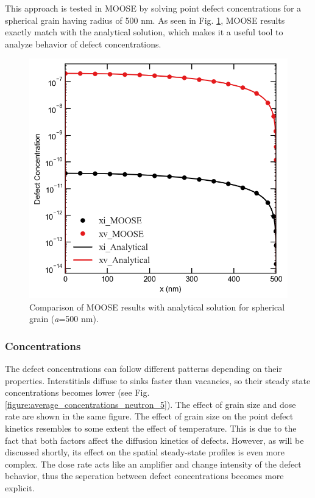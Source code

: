 \documentclass[a4paper]{article}
\begin{document}
  This approach is tested in MOOSE by solving point defect concentrations for a spherical grain having radius of 500 nm. As seen in Fig. \ref{figure:concentrations_MOOSE_analytical}, MOOSE results exactly match with the analytical solution, which makes it a useful tool to analyze behavior of defect concentrations.
  \begin{figure}[h!]
    \centering
    \includegraphics[scale=0.55]{concentration_profiles_MOOSE_Analytical_Neutron_0}
    \caption{Comparison of MOOSE results with analytical solution for spherical grain (\textit{a}=500 nm).}
    \label{figure:concentrations_MOOSE_analytical}
  \end{figure}
  \newpage
  \subsubsection{Concentrations} \hspace{10pt}
  The defect concentrations can follow different patterns depending on their properties. Interstitials diffuse to sinks faster than vacancies, so their steady state concentrations becomes lower (see Fig. \ref{figure:average_concentrations_neutron_5}). The effect of grain size and dose rate are shown in the same figure. The effect of grain size on the point defect kinetics resembles to some extent the effect of temperature. This is due to the fact that both factors affect the diffusion kinetics of defects. However, as will be discussed shortly, its effect on the spatial steady-state profiles is even more complex. The dose rate acts like an amplifier and change intensity of the defect behavior, thus the seperation between defect concentrations becomes more explicit.
\end{document}

